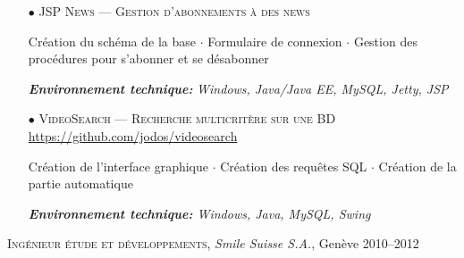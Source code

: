 \documentclass[11pt,a4paper]{moderncv}
\begin{document}
\begin{itemize}
		
	\item[$\bullet$] \textsc{JSP News --- Gestion d'abonnements à des news}    	
	\item[] Création du schéma de la base $\cdot$ Formulaire de connexion $\cdot$ Gestion des procédures pour s'abonner et se désabonner
	\item[] \emph{\textbf{Environnement technique:}} \emph{Windows, Java/Java EE, MySQL, Jetty, JSP}
	      	      	
	\item[$\bullet$] \textsc{VideoSearch --- Recherche multicritère sur une BD} \url{https://github.com/jodos/videosearch}
	\item[] Création de l'interface graphique $\cdot$ Création des requêtes SQL $\cdot$ Création de la partie automatique     	
	\item[] \emph{\textbf{Environnement technique:} {Windows, Java, MySQL, Swing}}
	      	      	
\end{itemize}

\vspace{2cm}

\begin{tcolorbox}[boxrule=0pt,arc=0pt,colback=lightgray]{\textsc{Ingénieur étude et développements}, \emph{Smile Suisse S.A.}, Genève \hfill 2010--2012}
\end{tcolorbox}
\end{document}
